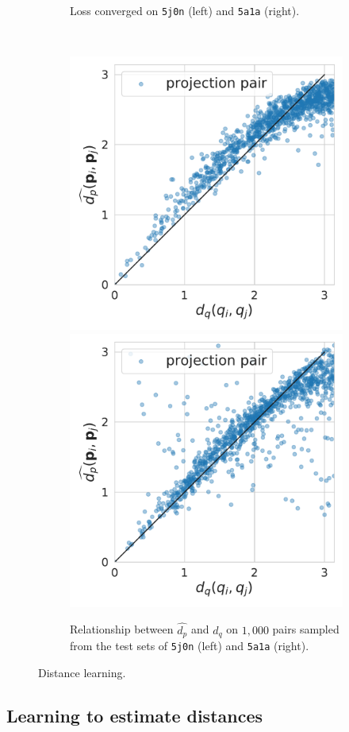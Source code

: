 \begin{figure}
\begin{minipage}[b]{0.45\linewidth}
\begin{subfigure}[b]{\linewidth}
            \caption{Loss converged on \texttt{5j0n} (left) and \texttt{5a1a} (right).\vspace{0.8em}}\label{fig:distance-learning:loss}
        \end{subfigure}
        \\ %
        \begin{subfigure}[b]{\linewidth}
            \centering
            \includegraphics[width=0.40\linewidth]{figures/dPdQ_5j0n_fullcov.pdf}
            \hspace{0.5cm}
            \includegraphics[width=0.40\linewidth]{figures/dPdQ_5a1a.pdf}
            \caption{Relationship between $\widehat{d_p}$ and $d_q$ on $1,000$ pairs sampled from the test sets of \texttt{5j0n} (left) and \texttt{5a1a} (right).}\label{fig:distance-learning:dpdq}
        \end{subfigure}
        \caption{Distance learning.
        }
    \end{minipage}
\end{figure}


\subsection{Learning to estimate distances}\label{sec:results:distance-estimation:learned}

